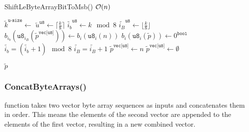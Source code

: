 \documentclass[../alan-handbook.tex]{subfiles}
\begin{document}
\begin{algorithm}
\caption{ShiftLeByteArrayBitToMsb() \hfill $\mathcal{O}(n)$}
\label{Alg:ShiftLeByteArrayBitToMsb}
\begin{algorithmic}[1]
        \State $\tilde{k}^{\texttt{u-size}} \gets$  %
                \State $\tilde{u}^{\texttt{u8}} \gets \lceil \frac{k}{8} \rceil$
                    \State $\tilde{i_b}^{\texttt{u8}} \gets k \mod 8$
                    \State $\tilde{i_B}^{\texttt{u8}} \gets \lfloor \frac{k}{8} \rfloor$
                \EndConcurrency
                            \State $b_{i_b}(\texttt{u8}_{i_B}(\tilde{p}^{\texttt{vec[u8]}})) \gets b_i(\texttt{u8}_i(n))$
                            \State $b_i(\texttt{u8}_i(\tilde{p})) \gets 0^{\texttt{bool}}$
                            \State $\tilde{i_b} = (\tilde{i_b} + 1) \mod 8$
                                \State $\tilde{i_B} = \tilde{i_B} + 1$
                            \EndIf
                        \EndFor
                    \EndFor
            \Else 
                \State $\tilde{p}^{\texttt{vec[u8]}} \gets n$
            \EndIf
        \Else 
            \State $\tilde{p}^{\texttt{vec[u8]}} \gets \emptyset$
        \EndIf
    
        \Return $\tilde{p}$
\EndFunction
\end{algorithmic}
\end{algorithm}

\subsubsection{ConcatByteArrays()} \label{ConcatByteArrays}

 function takes two vector byte array sequences as inputs and concatenates them in order. This means the elements of the second vector are appended to the elements of the first vector, resulting in a new combined vector.
\end{document}
